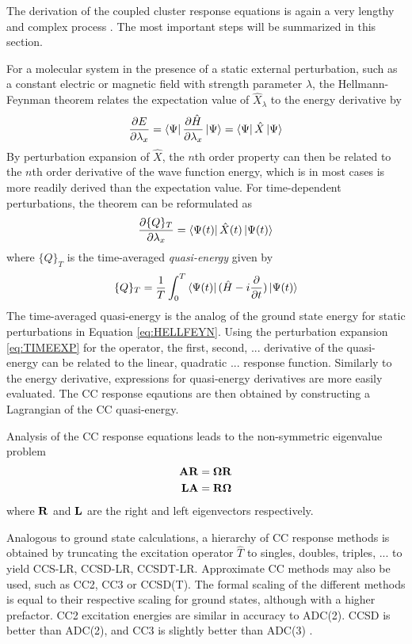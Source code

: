 The derivation of the coupled cluster response equations is again a very lengthy and complex process \cite{Koc1990,Chr1998}. The most important steps will be summarized in this section.

For a molecular system in the presence of a static external perturbation, such as a constant electric or magnetic field with strength parameter $\lambda$, the Hellmann-Feynman theorem relates the expectation value of $\hat{X}_{\lambda}$ to the energy derivative by
\begin{equation}
\frac{\partial E}{\partial \lambda_x} = \bra{\smash{\Psi}}\frac{\partial \hat{H}}{\partial \lambda_x} \ket{\smash{\Psi}} = \bra{\smash{\Psi}}\hat{X} \ket{\smash{\Psi}}
\label{eq:HELLFEYN}
\end{equation}
\noindent By perturbation expansion of $\hat{X}$, the $n$th order property can then be related to the $n$th order derivative of the wave function energy, which is in most cases is more readily derived than the expectation value. For time-dependent perturbations, the theorem can be reformulated as 
\begin{equation}
\frac{\partial \{Q\}_T}{\partial \lambda_x} = \bra{\smash{\Psi(t)}} \hat{X}(t) \ket{\smash{\Psi(t)}} 
\end{equation}
\noindent where $\{Q\}_T$ is the time-averaged \emph{quasi-energy} given by
\begin{equation}
\{Q\}_T = \frac{1}{T} \int_0^T \bra{\smash{\Psi(t)}} (\hat{H} - i\frac{\partial}{\partial t})\ket{\smash{\Psi(t)}}
\label{eq:HELLFEYN2}
\end{equation}
\noindent The time-averaged quasi-energy is the analog of the ground state energy for static perturbations in Equation \ref{eq:HELLFEYN}. Using the perturbation expansion \ref{eq:TIMEEXP} for the operator, the first, second, ... derivative of the quasi-energy can be related to the linear, quadratic ... response function. Similarly to the energy derivative, expressions for quasi-energy derivatives are more easily evaluated. The CC response eqautions are then obtained by constructing a Lagrangian of the CC quasi-energy. 

Analysis of the CC response equations leads to the non-symmetric eigenvalue problem
\begin{align}
\mathbf{A}\mathbf{R} &= \mathbf{\Omega}\mathbf{R} \\
\mathbf{L}\mathbf{A} &= \mathbf{R}\mathbf{\Omega} 
\end{align} 
\noindent where $\mathbf{R}$ and $\mathbf{L}$ are the right and left eigenvectors respectively.

Analogous to ground state calculations, a hierarchy of CC response methods is obtained by truncating the excitation operator $\hat{T}$ to singles, doubles, triples, ... to yield CCS-LR, CCSD-LR, CCSDT-LR. Approximate CC methods may also be used, such as CC2, CC3 or CCSD(T). The formal scaling of the different methods is equal to their respective scaling for ground states, although with a higher prefactor. CC2 excitation energies are similar in accuracy to ADC(2). CCSD is better than ADC(2), and CC3 is slightly better than ADC(3) \cite{Loo2020}. 

